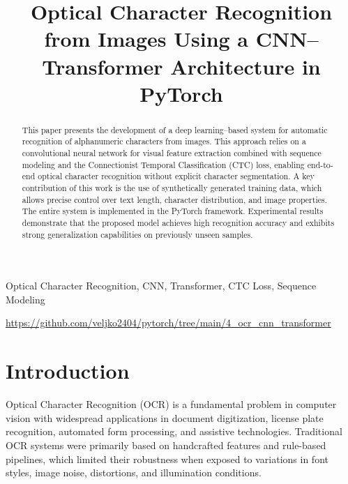 \documentclass[conference]{IEEEtran}
\begin{document}
\title{Optical Character Recognition from Images Using a CNN–Transformer Architecture in PyTorch}

\author{
}

\maketitle

\begin{abstract}

This paper presents the development of a deep learning–based system for automatic recognition of alphanumeric characters from images. This approach relies on a convolutional neural network for visual feature extraction combined with sequence modeling and the Connectionist Temporal Classification (CTC) loss, enabling end-to-end optical character recognition without explicit character segmentation. A key contribution of this work is the use of synthetically generated training data, which allows precise control over text length, character distribution, and image properties. The entire system is implemented in the PyTorch framework. Experimental results demonstrate that the proposed model achieves high recognition accuracy and exhibits strong generalization capabilities on previously unseen samples.

\end{abstract}

\begin{IEEEkeywords}
Optical Character Recognition, CNN, Transformer, CTC Loss, Sequence Modeling
\end{IEEEkeywords}

\url{https://github.com/veljko2404/pytorch/tree/main/4_ocr_cnn_transformer}

\section{\textbf{Introduction}}

Optical Character Recognition (OCR) is a fundamental problem in computer vision with widespread applications in document digitization, license plate recognition, automated form processing, and assistive technologies. Traditional OCR systems were primarily based on handcrafted features and rule-based pipelines, which limited their robustness when exposed to variations in font styles, image noise, distortions, and illumination conditions.
\end{document}
